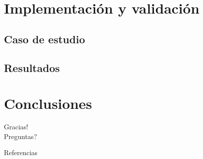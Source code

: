 \documentclass[10pt]{beamer}
\begin{document}
\section{Implementación y validación}


\subsection{Caso de estudio}

\subsection{Resultados}


\section{Conclusiones}



\begin{frame}[standout]
  Gracias!\\
  
  Preguntas?
\end{frame}

\nocite{*}
\begin{frame}[allowframebreaks]{Referencias}
  
  
\end{frame}
\end{document}
